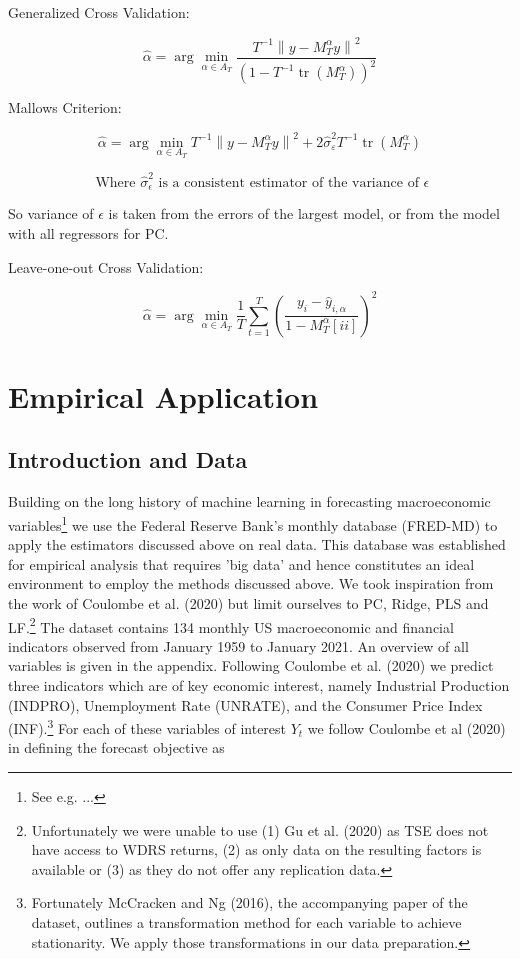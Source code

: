 Generalized Cross Validation:

\[\hat{\alpha}=\arg \min _{\alpha \in A_{T}} \frac{T^{-1}\left\|y-M_{T}^{\alpha} y\right\|^{2}}{\left(1-T^{-1} \operatorname{tr}\left(M_{T}^{\alpha}\right)\right)^{2}}\]

Mallows Criterion:

\[\hat{\alpha}=\arg \min _{\alpha \in A_{T}} T^{-1}\left\|y-M_{T}^{\alpha} y\right\|^{2}+2 \widehat{\sigma}_{\varepsilon}^{2} T^{-1} \operatorname{tr}\left(M_{T}^{\alpha}\right)\]

\[\text{ Where } \widehat{\sigma}_{\epsilon}^{2} \text{ is a consistent estimator of the variance of } \epsilon\]

So variance of $\epsilon$ is taken from the errors of the largest model, or from the model with all regressors for PC.

Leave-one-out Cross Validation:

\[\hat{\alpha}=\arg \min _{\alpha \in A_{T}} \frac{1}{T} \sum_{t=1}^{T}\left(\frac{y_{i}-\hat{y}_{i, \alpha}}{1-M_{T}^{\alpha}[ii]}\right)^{2}\]



\clearpage

\section{Empirical Application}
\subsection{Introduction and Data}
Building on the long history of machine learning in forecasting macroeconomic variables\footnote{See e.g. ...} we use the Federal Reserve Bank's monthly database (FRED-MD) to apply the estimators discussed above on real data. This database was established for empirical analysis that requires 'big data' and hence constitutes an ideal environment to employ the methods discussed above. We took inspiration from the work of Coulombe et al. (2020) but limit ourselves to PC, Ridge, PLS and LF.\footnote{Unfortunately we were unable to use (1) Gu et al. (2020) as TSE does not have access to WDRS returns, (2) as only data on the resulting factors is available or (3) as they do not offer any replication data.} 
The dataset contains 134 monthly US macroeconomic and financial indicators observed from January 1959 to January 2021. An overview of all variables is given in the appendix. 
Following Coulombe et al. (2020) we predict three indicators which are of key economic interest, namely Industrial Production (INDPRO), Unemployment Rate (UNRATE), and the Consumer Price Index (INF).\footnote{Fortunately McCracken and Ng (2016), the accompanying paper of the dataset, outlines a transformation method for each variable to achieve stationarity. We apply those transformations in our data preparation.}
For each of these variables of interest $Y_t$ we follow Coulombe et al (2020) in defining the forecast objective as

